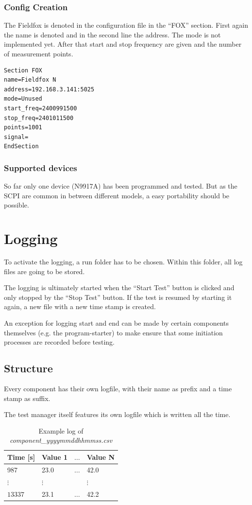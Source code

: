 \documentclass[10pt,a4paper]{article}
\begin{document}
	\subsubsection{Config Creation}	
	The Fieldfox is denoted in the configuration file in the \enquote{FOX} section. First again the name is denoted and in the second line the address. The mode is not implemented yet. After that start and stop frequency are given and the number of measurement points.
	
\begin{lstlisting}[caption=FOX Config]
Section FOX
name=Fieldfox N
address=192.168.3.141:5025
mode=Unused
start_freq=2400991500
stop_freq=2401011500
points=1001
signal=
EndSection
\end{lstlisting}
	
		\subsubsection{Supported devices}
		So far only one device (N9917A) has been programmed and tested. But as the SCPI are common in between different models, a easy portability should be possible.
	
\section{Logging}
To activate the logging, a run folder has to be chosen. Within this folder, all log files are going to be stored. 

The logging is ultimately started when the \enquote{Start Test} button is clicked and only stopped by the \enquote{Stop Test} button. If the test is resumed by starting it again, a new file with a new time stamp is created. 

An exception for logging start and end can be made by certain components themselves (e.g. the program-starter) to make ensure that some initiation processes are recorded before testing.


	\subsection{Structure}
	Every component has their own logfile, with their name as prefix and a time stamp as suffix.

	The test manager itself features its own logfile which is written all the time.	
	
	\begin{table}[H]
	\centering
	\caption{Example log of \textit{component\_yyyymmddhhmmss.csv}}	
	\begin{tabular}{llll}
	\toprule
	Time [s]		& Value 1	& $\hdots$	& Value N \\ \midrule
	987				& 23.0		& $\hdots$	& 42.0	\\
	$\vdots$		& $\vdots$	& 			& $\vdots$ \\
	$\num{13337}$	& 23.1		& $\hdots$	& 42.2	\\
	\bottomrule
	\end{tabular}
	\end{table}		
	
\end{document}
